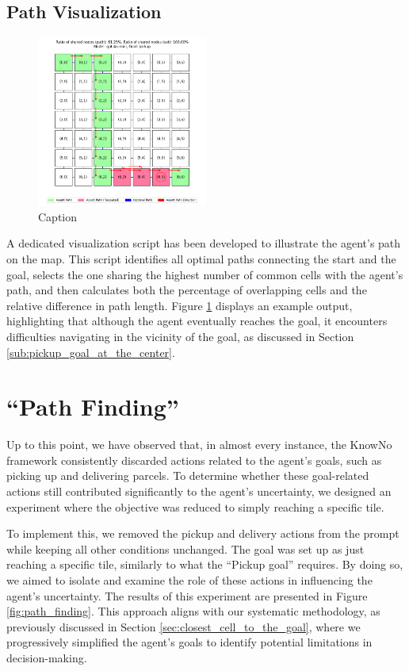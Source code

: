 \subsection{Path Visualization}
\begin{figure}[h]
  \centering
  \includegraphics[width=0.5\textwidth]{
    images/results_discussion/stateful/pickupBR_7x7.png
  }
  \caption{Caption}
  \label{fig:stateful_path}
\end{figure}

A dedicated visualization script has been developed to illustrate the agent's
path on the map. This script identifies all optimal paths connecting the start and
the goal, selects the one sharing the highest number of common cells with the
agent's path, and then calculates both the percentage of overlapping cells and the
relative difference in path length. Figure \ref{fig:stateful_path} displays an
example output, highlighting that although the agent eventually reaches the goal,
it encounters difficulties navigating in the vicinity of the goal, as discussed in
Section \ref{sub:pickup_goal_at_the_center}.

\section{``Path Finding''}

Up to this point, we have observed that, in almost every instance, the KnowNo framework
consistently discarded actions related to the agent's goals, such as picking up
and delivering parcels. To determine whether these goal-related actions still contributed
significantly to the agent's uncertainty, we designed an experiment where the
objective was reduced to simply reaching a specific tile.

To implement this, we removed the pickup and delivery actions from the prompt while
keeping all other conditions unchanged. The goal was set up as just reaching a
specific tile, similarly to what the ``Pickup goal'' requires. By doing so, we aimed
to isolate and examine the role of these actions in influencing the agent's uncertainty.
The results of this experiment are presented in Figure \ref{fig:path_finding}. This
approach aligns with our systematic methodology, as previously discussed in
Section \ref{sec:closest_cell_to_the_goal}, where we progressively simplified the
agent's goals to identify potential limitations in decision-making.

